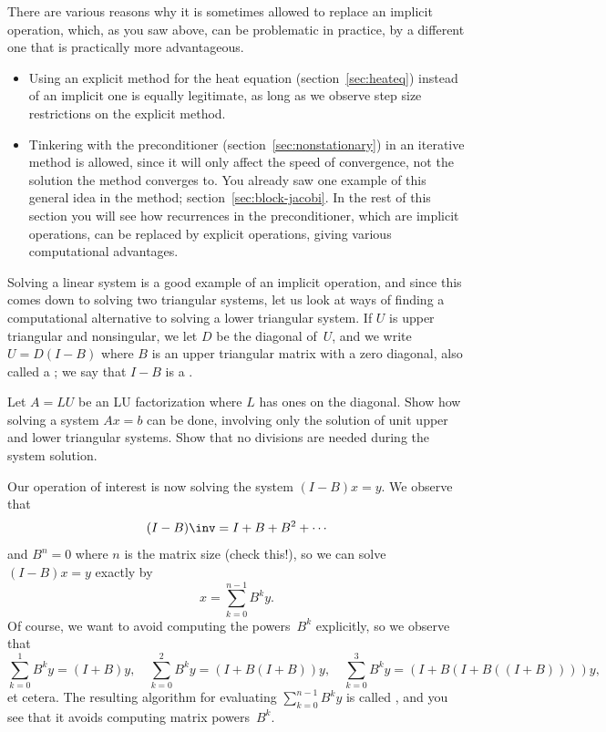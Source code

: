 There are various reasons why it is sometimes allowed to replace an
implicit operation, which, as you saw above, can be problematic in
practice, by a different one that is practically more advantageous.
\begin{itemize}
\item Using an explicit method for the heat equation
  (section~\ref{sec:heateq}) instead of an
  implicit one is equally legitimate, as long as we observe step size
  restrictions on the explicit method.
\item Tinkering with the preconditioner
  (section~\ref{sec:nonstationary}) in an iterative method is allowed,
  since it will only affect the speed of convergence, not the solution
  the method converges to. You already saw one example of this general
  idea in the  method;
  section~\ref{sec:block-jacobi}. In the rest of this section you will
  see how recurrences in the preconditioner, which are implicit
  operations, can be replaced by explicit operations, giving various
  computational advantages.
\end{itemize}

Solving a linear system is a good example of an implicit operation,
and since this comes down to solving two triangular systems, let us
look at ways of finding a computational alternative to solving a lower
triangular system. If $U$ is upper triangular and nonsingular, we let
$D$ be the diagonal of~$U$, and we write $U=D(I-B)$ where $B$ is an
upper triangular matrix with a zero diagonal, also called a
; we say that $I-B$ is
a .

\begin{exercise}
  Let $A=LU$ be an LU factorization where $L$ has ones on the
  diagonal. Show how solving a system $Ax=b$ can be done, involving
  only the solution of unit upper and lower triangular systems. Show
  that no divisions are needed during the system solution.
\end{exercise}

Our operation of interest is now solving the system $(I-B)x=y$. We
observe that
\begin{equation}
  (I-B)\inv = I+B+B^2+\cdots
  \label{eq:neuman-series}
\end{equation}
and $B^n=0$ where $n$ is the matrix size (check
this!), so we can solve $(I-B) x = y$ exactly by 
\[ x = \sum_{k=0}^{n-1}B^k y. \]
Of course, we want to avoid computing the powers~$B^k$ explicitly, so
we observe that
\begin{equation}
 \sum_{k=0}^1B^ky = (I+B)y,\quad \sum_{k=0}^2B^ky =
 (I+B(I+B))y,\quad \sum_{k=0}^3B^ky = (I+B(I+B((I+B))))y,
 \label{eq:horner}
\end{equation}
et cetera.
The resulting algorithm for evaluating $\sum_{k=0}^{n-1}B^k y$ is
called , and you see that it avoids computing
matrix powers~$B^k$.

